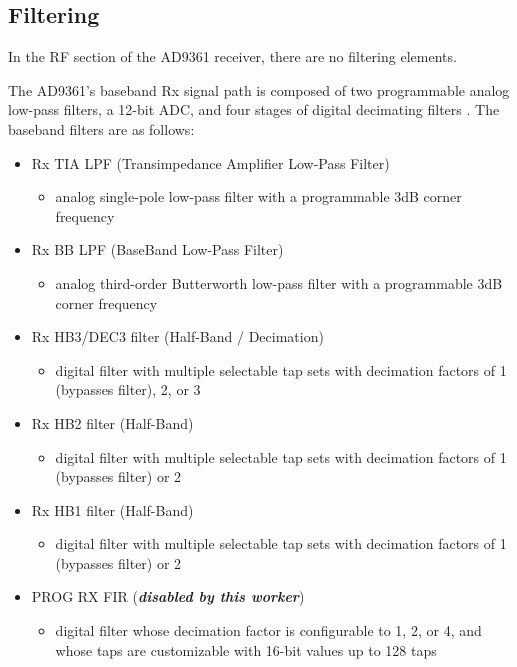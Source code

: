 \documentclass{article}
\begin{document}
\subsection*{Filtering}
In the RF section of the AD9361 receiver, there are no filtering elements.\par\medskip
\noindent The AD9361's baseband Rx
signal path is composed of two programmable analog low-pass
filters, a 12-bit ADC, and four stages of digital decimating
filters \cite{adi_ug570}.
\noindent The baseband filters are as follows:
\begin{itemize}
\item Rx TIA LPF (Transimpedance Amplifier Low-Pass Filter)
\begin{itemize}
\item analog single-pole low-pass filter with a programmable 3dB corner frequency
\end{itemize}
\item Rx BB LPF (BaseBand Low-Pass Filter)
\begin{itemize}
\item analog third-order Butterworth low-pass filter with a programmable 3dB corner frequency
\end{itemize}
\item Rx HB3/DEC3 filter (Half-Band / Decimation)
\begin{itemize}
\item digital filter with multiple selectable tap sets with decimation factors of 1 (bypasses filter), 2, or 3
\end{itemize}
\item Rx HB2 filter (Half-Band)
\begin{itemize}
\item digital filter with multiple selectable tap sets with decimation factors of 1 (bypasses filter) or 2
\end{itemize}
\item Rx HB1 filter (Half-Band)
\begin{itemize}
\item digital filter with multiple selectable tap sets with decimation factors of 1 (bypasses filter) or 2
\end{itemize}
\item PROG RX FIR (\textit{\textbf{disabled by this worker}})
\begin{itemize}
\item digital filter whose decimation factor is configurable to 1, 2, or 4, and whose taps are customizable with 16-bit values up to 128 taps
\end{itemize}
\end{itemize}
\end{document}
